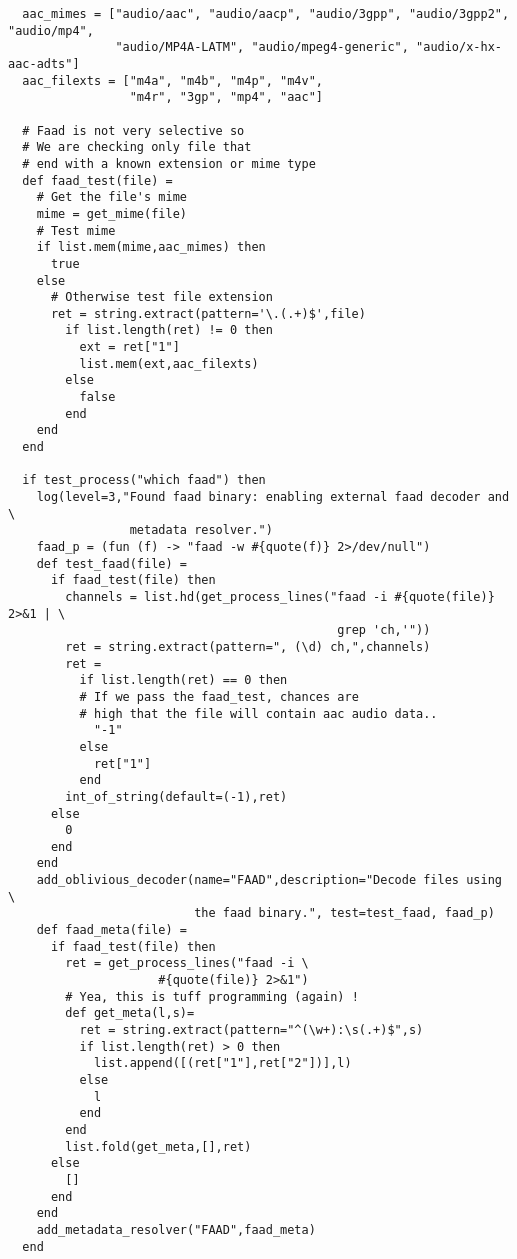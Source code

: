 \begin{verbatim}
  aac_mimes = ["audio/aac", "audio/aacp", "audio/3gpp", "audio/3gpp2", "audio/mp4",
               "audio/MP4A-LATM", "audio/mpeg4-generic", "audio/x-hx-aac-adts"]
  aac_filexts = ["m4a", "m4b", "m4p", "m4v",
                 "m4r", "3gp", "mp4", "aac"]

  # Faad is not very selective so
  # We are checking only file that
  # end with a known extension or mime type
  def faad_test(file) =
    # Get the file's mime
    mime = get_mime(file)
    # Test mime
    if list.mem(mime,aac_mimes) then
      true
    else
      # Otherwise test file extension
      ret = string.extract(pattern='\.(.+)$',file)
        if list.length(ret) != 0 then
          ext = ret["1"]
          list.mem(ext,aac_filexts)
        else
          false
        end
    end
  end

  if test_process("which faad") then
    log(level=3,"Found faad binary: enabling external faad decoder and \
                 metadata resolver.")
    faad_p = (fun (f) -> "faad -w #{quote(f)} 2>/dev/null")
    def test_faad(file) =
      if faad_test(file) then
        channels = list.hd(get_process_lines("faad -i #{quote(file)} 2>&1 | \
                                              grep 'ch,'"))
        ret = string.extract(pattern=", (\d) ch,",channels)
        ret =
          if list.length(ret) == 0 then
          # If we pass the faad_test, chances are
          # high that the file will contain aac audio data..
            "-1"
          else
            ret["1"]
          end
        int_of_string(default=(-1),ret)
      else
        0
      end
    end
    add_oblivious_decoder(name="FAAD",description="Decode files using \
                          the faad binary.", test=test_faad, faad_p)
    def faad_meta(file) =
      if faad_test(file) then
        ret = get_process_lines("faad -i \
                     #{quote(file)} 2>&1")
        # Yea, this is tuff programming (again) !
        def get_meta(l,s)=
          ret = string.extract(pattern="^(\w+):\s(.+)$",s)
          if list.length(ret) > 0 then
            list.append([(ret["1"],ret["2"])],l)
          else
            l
          end
        end
        list.fold(get_meta,[],ret)
      else
        []
      end
    end
    add_metadata_resolver("FAAD",faad_meta)
  end
\end{verbatim}
